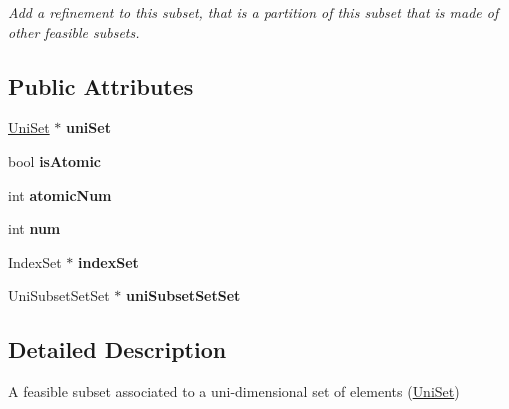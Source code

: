 \begin{DoxyCompactItemize}
\begin{DoxyCompactList}\small\item\em Add a refinement to this subset, that is a partition of this subset that is made of other feasible subsets. \end{DoxyCompactList}\end{DoxyCompactItemize}
\subsection*{Public Attributes}
\begin{DoxyCompactItemize}
\item 
\hypertarget{classUniSubset_a8e80f41fd95fe897ff04c813395c85d4}{\hyperlink{classUniSet}{Uni\-Set} $\ast$ {\bfseries uni\-Set}}\label{classUniSubset_a8e80f41fd95fe897ff04c813395c85d4}

\item 
\hypertarget{classUniSubset_a33f088ffb21e664508cfbfb75341513a}{bool {\bfseries is\-Atomic}}\label{classUniSubset_a33f088ffb21e664508cfbfb75341513a}

\item 
\hypertarget{classUniSubset_af111f69a265de0069e5705ce2c222f45}{int {\bfseries atomic\-Num}}\label{classUniSubset_af111f69a265de0069e5705ce2c222f45}

\item 
\hypertarget{classUniSubset_a0b5a528a9edcc11061baff6ca4ce2657}{int {\bfseries num}}\label{classUniSubset_a0b5a528a9edcc11061baff6ca4ce2657}

\item 
\hypertarget{classUniSubset_a32f7ed1b58639b5184c7c0321b08e6a1}{Index\-Set $\ast$ {\bfseries index\-Set}}\label{classUniSubset_a32f7ed1b58639b5184c7c0321b08e6a1}

\item 
\hypertarget{classUniSubset_a00491b5c614c9f1a548bec0a9e8aad4f}{Uni\-Subset\-Set\-Set $\ast$ {\bfseries uni\-Subset\-Set\-Set}}\label{classUniSubset_a00491b5c614c9f1a548bec0a9e8aad4f}

\end{DoxyCompactItemize}


\subsection{Detailed Description}
A feasible subset associated to a uni-\/dimensional set of elements (\hyperlink{classUniSet}{Uni\-Set}) 

